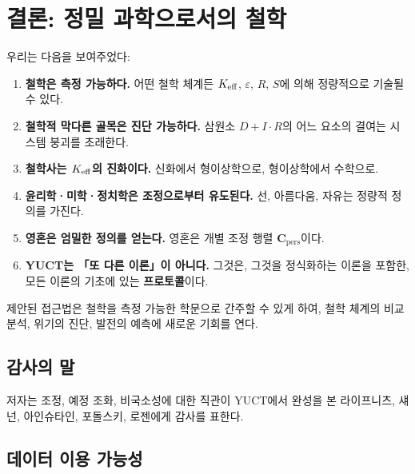 \documentclass[11pt,a4paper]{article}
\newcommand{\eps}{\varepsilon}
\newcommand{\Cpers}{\mathbf{C}_{\text{pers}}}
\begin{document}
	
	\section{결론: 정밀 과학으로서의 철학}
	
	우리는 다음을 보여주었다:
	
	\begin{enumerate}
		\item \textbf{철학은 측정 가능하다.} 어떤 철학 체계든 \(\Keff\), \(\eps\), \(R\), \(S\)에 의해 정량적으로 기술될 수 있다.
		\item \textbf{철학적 막다른 골목은 진단 가능하다.} 삼원소 \(D + I \cdot R\)의 어느 요소의 결여는 시스템 붕괴를 초래한다.
		\item \textbf{철학사는 \(\Keff\)의 진화이다.} 신화에서 형이상학으로, 형이상학에서 수학으로.
		\item \textbf{윤리학·미학·정치학은 조정으로부터 유도된다.} 선, 아름다움, 자유는 정량적 정의를 가진다.
		\item \textbf{영혼은 엄밀한 정의를 얻는다.} 영혼은 개별 조정 행렬 \(\Cpers\)이다.
		\item \textbf{YUCT는 「또 다른 이론」이 아니다.} 그것은, 그것을 정식화하는 이론을 포함한, 모든 이론의 기초에 있는 \textbf{프로토콜}이다.
	\end{enumerate}
	
	제안된 접근법은 철학을 측정 가능한 학문으로 간주할 수 있게 하여, 철학 체계의 비교 분석, 위기의 진단, 발전의 예측에 새로운 기회를 연다.
	
	\begin{center}
	\end{center}
	
	\subsection*{감사의 말}
	
	저자는 조정, 예정 조화, 비국소성에 대한 직관이 YUCT에서 완성을 본 라이프니츠, 섀넌, 아인슈타인, 포돌스키, 로젠에게 감사를 표한다.
	
	\subsection*{데이터 이용 가능성}
	
\end{document}
